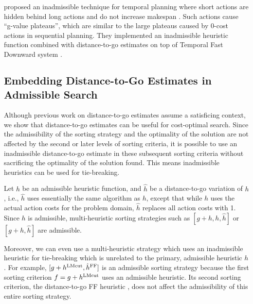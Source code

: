  proposed an inadmissible technique for temporal planning where short actions are
hidden behind long actions and do not increase makespan \cite{benton2010g}. Such actions cause  ``g-value
plateaus'', which are similar to the large plateaus caused by 0-cost actions in sequential planning.  They implemented an inadmissible
heuristic function combined with distance-to-go estimates on top of Temporal Fast Downward system
\cite{eyerich2009using}.  %


\subsection{Embedding Distance-to-Go Estimates in Admissible Search}

Although previous work on distance-to-go estimates assume a satisficing context,
we show that distance-to-go estimates can be useful for cost-optimal search.
Since the admissibility of the sorting strategy and the optimality of the solution are not affected by the
second or later levels of sorting criteria, it is possible to use an inadmissible distance-to-go estimate
in these subsequent sorting criteria without sacrificing the optimality of the solution found.
This means inadmissible heuristics can be used for tie-breaking.


Let $h$ be an admissible heuristic function, and
$\hat{h}$ be a distance-to-go variation of $h$, i.e., $\hat{h}$ uses essentially the same algorithm as $h$, except that while $h$ uses the actual action costs for the problem domain, $\hat{h}$ replaces all action costs with 1.
Since $h$ is admissible, multi-heuristic sorting strategies such as $[g+h,h,\hat{h}]$ or $[g+h,\hat{h}]$
are admissible.

Moreover, we can even use a multi-heuristic strategy which uses an inadmissible heuristic for tie-breaking which is unrelated to the primary, admissible heuristic $h$.
 For example, $[g+h^{\text{LMcut}},\hat{h}^{\text{FF}}]$ is an admissible sorting strategy
because the first sorting criterion $f=g+h^{\text{LMcut}}$ uses an admissible
\lmcut heuristic. Its second sorting criterion, the distance-to-go FF
heuristic \cite{Hoffmann01}, does not affect the admissibility of this entire sorting strategy.


